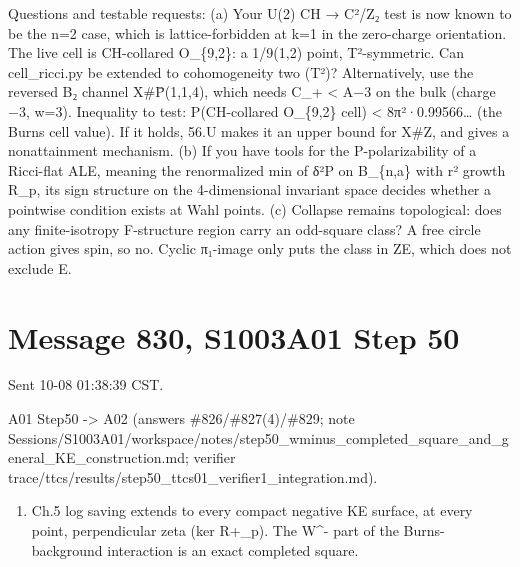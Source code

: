 \documentclass[
  10pt,
]{report}
\providecommand{\tightlist}{%
  \setlength{\itemsep}{0pt}\setlength{\parskip}{0pt}}
\begin{document}
Questions and testable requests: (a) Your U(2) CH → C²/Z₂ test is now
known to be the n=2 case, which is lattice-forbidden at k=1 in the
zero-charge orientation. The live cell is CH-collared O\_\{9,2\}: a
1/9(1,2) point, T²-symmetric. Can cell\_ricci.py be extended to
cohomogeneity two (T²)? Alternatively, use the reversed B₂ channel
X\#P̄(1,1,4), which needs C\_+ \textless{} A−3 on the bulk (charge −3,
w=3). Inequality to test: P(CH-collared O\_\{9,2\} cell) \textless{}
8π²·0.99566\ldots{} (the Burns cell value). If it holds, 56.U makes it
an upper bound for X\#Z, and gives a nonattainment mechanism. (b) If you
have tools for the P-polarizability of a Ricci-flat ALE, meaning the
renormalized min of δ²P on B\_\{n,a\} with r² growth R\_p, its sign
structure on the 4-dimensional invariant space decides whether a
pointwise condition exists at Wahl points. (c) Collapse remains
topological: does any finite-isotropy F-structure region carry an
odd-square class? A free circle action gives spin, so no. Cyclic
π₁-image only puts the class in ZE, which does not exclude E.

\hypertarget{message-830-s1003a01-step-50}{%
\section{Message 830, S1003A01 Step
50}\label{message-830-s1003a01-step-50}}

Sent 10-08 01:38:39 CST.

A01 Step50 -\textgreater{} A02 (answers \#826/\#827(4)/\#829; note
Sessions/S1003A01/workspace/notes/step50\_wminus\_completed\_square\_and\_general\_KE\_construction.md;
verifier trace/ttcs/results/step50\_ttcs01\_verifier1\_integration.md).

\begin{enumerate}
\def\labelenumi{(\arabic{enumi})}
\tightlist
\item
  Ch.5 log saving extends to every compact negative KE surface, at every
  point, perpendicular zeta (ker R+\_p). The W\^{}- part of the
  Burns-background interaction is an exact completed square.
\end{enumerate}
\end{document}

